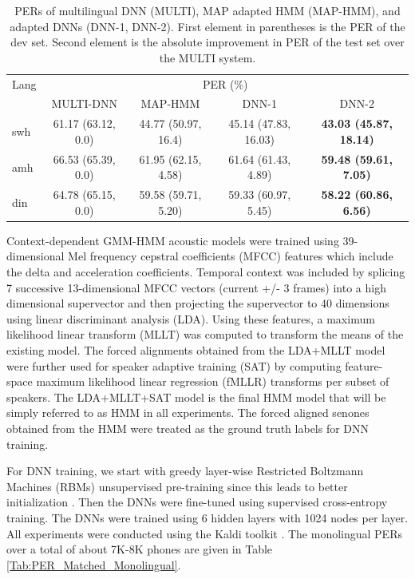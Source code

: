 \documentclass[a4paper]{article}
\begin{document}
\begin{table}[t]
\centering %
\caption{PERs of multilingual DNN (MULTI), MAP adapted HMM (MAP-HMM), and adapted DNNs (DNN-1, DNN-2). First element in parentheses is the PER of the dev set. Second element is the absolute improvement in PER of the test set over the MULTI system.}
\begin{tabular}{l|c c c c}
   \hline
Lang  & \multicolumn{4}{c}{PER (\%)} \\
        &MULTI-DNN        	   &MAP-HMM         		&DNN-1          &DNN-2          \\ \hline
swh      & 61.17 (63.12, 0.0) &44.77 (50.97, 16.4) &45.14 (47.83, 16.03) &\bf{43.03 (45.87, 18.14)}        \\
amh      & 66.53 (65.39, 0.0) &61.95 (62.15, 4.58)  &61.64  (61.43, 4.89)  &\bf{59.48 (59.61, 7.05)}     \\ 
din      &64.78 (65.15, 0.0) &59.58 (59.71, 5.20)  &59.33 (60.97, 5.45)  &\bf{58.22 (60.86, 6.56)}    \\ \hline
\end{tabular}
\vspace{-5mm}
\label{Tab:PER_PT}
\end{table}

Context-dependent GMM-HMM acoustic models were trained using 39-dimensional Mel frequency cepstral coefficients (MFCC) features which include the delta and acceleration coefficients. Temporal context was included by splicing 7 successive 13-dimensional MFCC vectors (current +/- 3 frames) into a high dimensional supervector and then projecting the supervector to 40 dimensions using linear discriminant analysis (LDA). Using these features, a maximum likelihood linear transform (MLLT) \cite{Gopinath-MLLT} was computed to transform the means of the existing model. The forced alignments obtained from the LDA+MLLT model were further used for speaker adaptive training (SAT) by computing feature-space maximum likelihood linear regression (fMLLR) transforms \cite{Gales-CMLLR} per subset of speakers. The LDA+MLLT+SAT model is the final HMM model that will be simply referred to as HMM in all experiments. The forced aligned senones obtained from the HMM were treated as the ground truth labels for DNN training. 

For DNN training, we start with greedy layer-wise Restricted Boltzmann Machines (RBMs) unsupervised pre-training since this leads to better initialization \cite{Bengio-Pretraining}. Then the DNNs were fine-tuned using supervised cross-entropy training. The DNNs were trained using 6 hidden layers with 1024 nodes per layer. All experiments were conducted using the Kaldi toolkit \cite{Povey-Kaldi}. The monolingual PERs over a total of about 7K-8K phones are given in Table \ref{Tab:PER_Matched_Monolingual}. 
\end{document}
